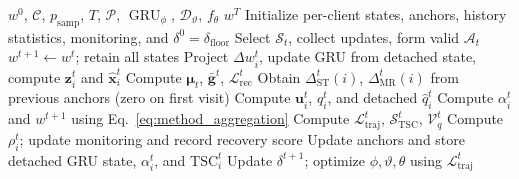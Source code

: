 \renewcommand{\algorithmicrequire}{\textbf{Input:}}
\renewcommand{\algorithmicensure}{\textbf{Output:}}
\begin{algorithm}[t]
\caption{TrajRep-FL}
\label{alg:trajrep_fl}
\begin{algorithmic}[1]
\REQUIRE $w^0$, $\mathcal C$, $p_{\mathrm{samp}}$, $T$, $\mathcal P$, $\operatorname{GRU}_{\phi}$, $\mathcal D_{\vartheta}$, $f_{\theta}$
\ENSURE $w^T$
\STATE Initialize per-client states, anchors, history statistics, monitoring, and $\delta^0=\delta_{\mathrm{floor}}$
\STATE Select $\mathcal S_t$, collect updates, form valid $\mathcal A_t$
\STATE $w^{t+1}\gets w^t$; retain all states
\ELSE
{}
\STATE Project $\Delta w_i^t$, update GRU from detached state, compute $\mathbf z_i^t$ and $\widehat{\mathbf x}_i^t$
\ENDFOR
\STATE Compute $\boldsymbol\mu_t$, $\bar{\mathbf g}^t$, $\mathcal L_{\mathrm{rec}}^t$
\STATE Obtain $\Delta_{\mathrm{ST}}^t(i)$, $\Delta_{\mathrm{MR}}^t(i)$ from previous anchors (zero on first visit)
\STATE Compute $\mathbf u_i^t$, $q_i^t$, and detached $\widehat q_i^t$
\ENDFOR
\STATE Compute $\alpha_i^t$ and $w^{t+1}$ using Eq.~\eqref{eq:method_aggregation}
\STATE Compute $\mathcal L_{\mathrm{traj}}^t$, $\mathcal S_{\mathrm{TSC}}^t$, $\mathcal V_q^t$
\STATE Compute $\rho_i^t$; update monitoring and record recovery score
\STATE Update anchors and store detached GRU state, $\alpha_i^t$, and $\mathrm{TSC}_i^t$
\ENDFOR
\STATE Update $\delta^{t+1}$; optimize $\phi,\vartheta,\theta$ using $\mathcal L_{\mathrm{traj}}^t$
\ENDIF
\ENDFOR
\end{algorithmic}
\end{algorithm}
